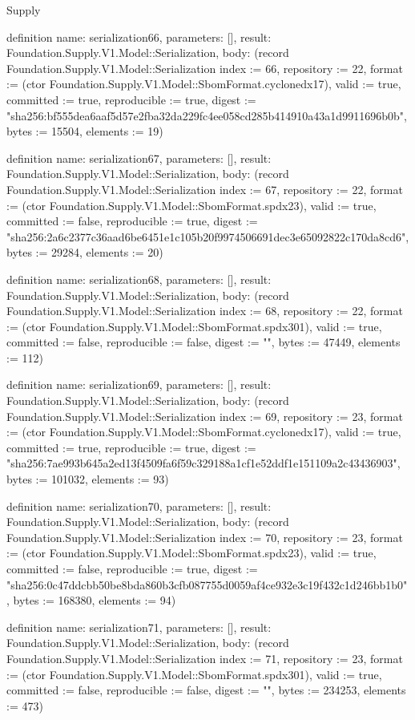 \begin{lexlean}{Supply}
\begin{semanticmodule}
definition{
  name: serialization66,
  parameters: [],
  result: Foundation.Supply.V1.Model::Serialization,
  body: (record Foundation.Supply.V1.Model::Serialization {index := 66, repository := 22, format := (ctor Foundation.Supply.V1.Model::SbomFormat.cyclonedx17), valid := true, committed := true, reproducible := true, digest := "sha256:bf555dea6aaf5d57e2fba32da229fc4ee058cd285b414910a43a1d9911696b0b", bytes := 15504, elements := 19})
}

definition{
  name: serialization67,
  parameters: [],
  result: Foundation.Supply.V1.Model::Serialization,
  body: (record Foundation.Supply.V1.Model::Serialization {index := 67, repository := 22, format := (ctor Foundation.Supply.V1.Model::SbomFormat.spdx23), valid := true, committed := false, reproducible := true, digest := "sha256:2a6c2377c36aad6be6451e1c105b20f9974506691dec3e65092822c170da8cd6", bytes := 29284, elements := 20})
}

definition{
  name: serialization68,
  parameters: [],
  result: Foundation.Supply.V1.Model::Serialization,
  body: (record Foundation.Supply.V1.Model::Serialization {index := 68, repository := 22, format := (ctor Foundation.Supply.V1.Model::SbomFormat.spdx301), valid := true, committed := false, reproducible := false, digest := "", bytes := 47449, elements := 112})
}

definition{
  name: serialization69,
  parameters: [],
  result: Foundation.Supply.V1.Model::Serialization,
  body: (record Foundation.Supply.V1.Model::Serialization {index := 69, repository := 23, format := (ctor Foundation.Supply.V1.Model::SbomFormat.cyclonedx17), valid := true, committed := true, reproducible := true, digest := "sha256:7ae993b645a2ed13f4509fa6f59c329188a1cf1e52ddf1e151109a2c43436903", bytes := 101032, elements := 93})
}

definition{
  name: serialization70,
  parameters: [],
  result: Foundation.Supply.V1.Model::Serialization,
  body: (record Foundation.Supply.V1.Model::Serialization {index := 70, repository := 23, format := (ctor Foundation.Supply.V1.Model::SbomFormat.spdx23), valid := true, committed := false, reproducible := true, digest := "sha256:0c47ddcbb50be8bda860b3cfb087755d0059af4ce932e3c19f432c1d246bb1b0", bytes := 168380, elements := 94})
}

definition{
  name: serialization71,
  parameters: [],
  result: Foundation.Supply.V1.Model::Serialization,
  body: (record Foundation.Supply.V1.Model::Serialization {index := 71, repository := 23, format := (ctor Foundation.Supply.V1.Model::SbomFormat.spdx301), valid := true, committed := false, reproducible := false, digest := "", bytes := 234253, elements := 473})
}


\end{semanticmodule}
\end{lexlean}
